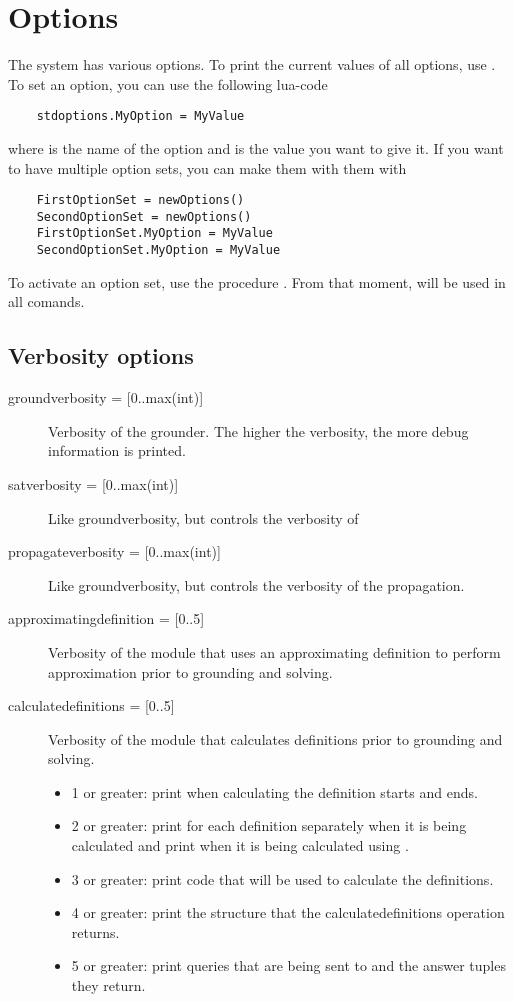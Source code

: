 \section{Options}
The \idp system has various options. To print the current values of all options, use .  To set an option, you can use the following lua-code
\begin{lstlisting}
	stdoptions.MyOption = MyValue
\end{lstlisting}
where  is the name of the option and  is the value you want to give it. If you want to have multiple option sets, you can make them with them with
\begin{lstlisting}
	FirstOptionSet = newOptions()
	SecondOptionSet = newOptions()
	FirstOptionSet.MyOption = MyValue
	SecondOptionSet.MyOption = MyValue
\end{lstlisting}
To activate an option set, use the procedure .  From that moment,  will be used in all comands.

\subsection{Verbosity options}
\begin{description}
	\item[{groundverbosity = [0..max(int)]}] Verbosity of the grounder.  The higher the verbosity, the more debug information is printed.
	\item[{satverbosity = [0..max(int)]}] Like groundverbosity, but controls the verbosity of \minisatid
	\item[{propagateverbosity = [0..max(int)]}] Like groundverbosity, but controls the verbosity of the propagation.
	\item[{approximatingdefinition = [0..5]}] Verbosity of the module that uses an approximating definition to perform approximation prior to grounding and solving. 
	\item[{calculatedefinitions = [0..5]}] Verbosity of the module that calculates definitions prior to grounding and solving. 
		\begin{itemize}
		\item 1 or greater: print when calculating the definition starts and ends.
		\item 2 or greater: print for each definition separately when it is being calculated and print when it is being calculated using \xsb.
		\item 3 or greater: print \xsb code that will be used to calculate the definitions.
		\item 4 or greater: print the structure that the calculatedefinitions operation returns.
		\item 5 or greater: print queries that are being sent to \xsb and the answer tuples they return.
		\end{itemize}
\end{description}

